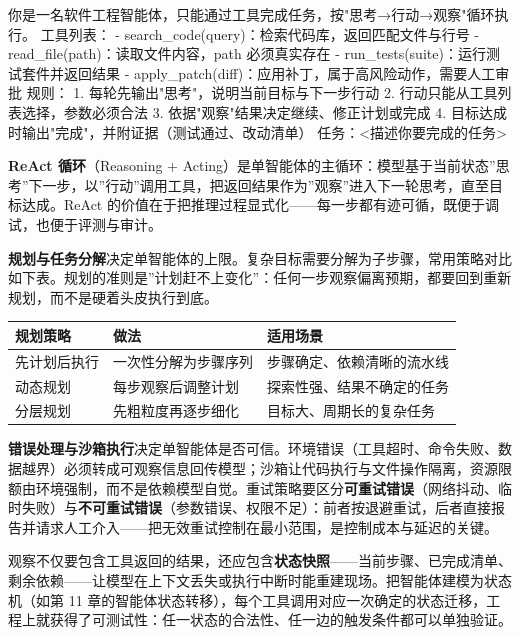 \documentclass[12pt,a4paper,twoside,openany]{ctexbook}
\numberwithin{figure}{chapter}
\numberwithin{table}{chapter}
\newenvironment{Shaded}{}{}
\newcommand{\NormalTok}[1]{#1}
\newcounter{none}
\begin{document}
\begin{Shaded}
\begin{Highlighting}[]
\NormalTok{你是一名软件工程智能体，只能通过工具完成任务，按"思考→行动→观察"循环执行。}
\NormalTok{工具列表：}
\NormalTok{{-} search\_code(query)：检索代码库，返回匹配文件与行号}
\NormalTok{{-} read\_file(path)：读取文件内容，path 必须真实存在}
\NormalTok{{-} run\_tests(suite)：运行测试套件并返回结果}
\NormalTok{{-} apply\_patch(diff)：应用补丁，属于高风险动作，需要人工审批}
\NormalTok{规则：}
\NormalTok{1. 每轮先输出"思考"，说明当前目标与下一步行动}
\NormalTok{2. 行动只能从工具列表选择，参数必须合法}
\NormalTok{3. 依据"观察"结果决定继续、修正计划或完成}
\NormalTok{4. 目标达成时输出"完成"，并附证据（测试通过、改动清单）}
\NormalTok{任务：\textless{}描述你要完成的任务\textgreater{}}
\end{Highlighting}
\end{Shaded}

\textbf{ReAct 循环}（Reasoning +
Acting）是单智能体的主循环：模型基于当前状态''思考''下一步，以''行动''调用工具，把返回结果作为''观察''进入下一轮思考，直至目标达成。ReAct
的价值在于把推理过程显式化------每一步都有迹可循，既便于调试，也便于评测与审计。

\textbf{规划与任务分解}决定单智能体的上限。复杂目标需要分解为子步骤，常用策略对比如下表。规划的准则是''计划赶不上变化''：任何一步观察偏离预期，都要回到重新规划，而不是硬着头皮执行到底。

{\def\LTcaptype{none} %
\begin{longtable}[]{@{}lll@{}}
\toprule\noalign{}
规划策略 & 做法 & 适用场景 \\
\midrule\noalign{}
\endhead
\bottomrule\noalign{}
\endlastfoot
先计划后执行 & 一次性分解为步骤序列 & 步骤确定、依赖清晰的流水线 \\
动态规划 & 每步观察后调整计划 & 探索性强、结果不确定的任务 \\
分层规划 & 先粗粒度再逐步细化 & 目标大、周期长的复杂任务 \\
\end{longtable}
}

\textbf{错误处理与沙箱执行}决定单智能体是否可信。环境错误（工具超时、命令失败、数据越界）必须转成可观察信息回传模型；沙箱让代码执行与文件操作隔离，资源限额由环境强制，而不是依赖模型自觉。重试策略要区分\textbf{可重试错误}（网络抖动、临时失败）与\textbf{不可重试错误}（参数错误、权限不足）：前者按退避重试，后者直接报告并请求人工介入------把无效重试控制在最小范围，是控制成本与延迟的关键。

观察不仅要包含工具返回的结果，还应包含\textbf{状态快照}------当前步骤、已完成清单、剩余依赖------让模型在上下文丢失或执行中断时能重建现场。把智能体建模为状态机（如第
11
章的智能体状态转移），每个工具调用对应一次确定的状态迁移，工程上就获得了可测试性：任一状态的合法性、任一边的触发条件都可以单独验证。
\end{document}
